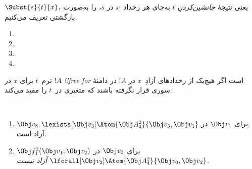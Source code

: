 \documentclass[../../../include/open-logic-section]{subfiles}
\begin{document}


\begin{defn}
$\Subst{s}{t}{x}$، یعنی نتیجهٔ \emph{جانشین‌کردنِ} $t$ به‌جای
هر رخداد~$x$ در $s$، را به‌صورت بازگشتی تعریف می‌کنیم:
\begin{enumerate}
\item {}

\item {}

\item {}

\item{}
\end{enumerate}
\end{defn}

\begin{defn}
ترم~$t$ برای $x$ در $!A$ \emph{!!{free for}} است اگر هیچ‌یک از
رخدادهای آزادِ~$x$ در $!A$ در دامنهٔ سوری قرار نگرفته باشند که
متغیری در~$t$ را مقید می‌کند.
\end{defn}

\begin{ex} ~
\begin{enumerate}
\item $\Obj v_8$ برای $\Obj v_1$ در $\lexists[\Obj
  v_3]\Atom{\Obj A^2_4}{\Obj v_3,\Obj v_1}$ آزاد است.

\item $\Obj f^2_1(\Obj v_1, \Obj v_2)$ برای $\Obj
  v_0$ در $\lforall[\Obj v_2]\Atom{\Obj A^2_4}{\Obj v_0,\Obj v_2}$
  \emph{آزاد نیست}.
\end{enumerate}
\end{ex}
\end{document}
